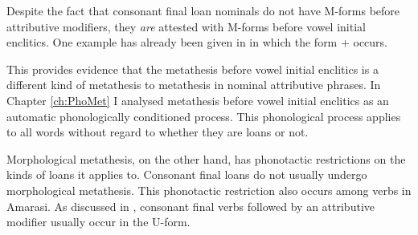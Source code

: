 Despite the fact that consonant final loan nominals
do not have M-forms before attributive modifiers,
they \emph{are} attested with M-forms before vowel initial enclitics.
One example has already been given in 
in which the form  {\la}  +  occurs.

This provides evidence that the metathesis before vowel initial enclitics
is a different kind of metathesis to metathesis in nominal attributive phrases.
In Chapter \ref{ch:PhoMet} I analysed metathesis before vowel initial enclitics
as an automatic phonologically conditioned process.
This phonological process applies to all words without regard to whether they are loans or not.

Morphological metathesis, on the other hand, has phonotactic
restrictions on the kinds of loans it applies to.
Consonant final loans do not usually undergo morphological metathesis.
This phonotactic restriction also occurs among verbs in Amarasi.
As discussed in , consonant final verbs
followed by an attributive modifier usually occur in the U-form.